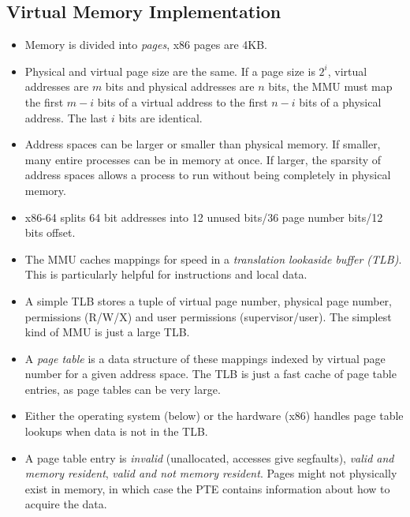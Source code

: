 \documentclass[12pt]{article}
\begin{document}
\subsection{Virtual Memory Implementation}
\begin{itemize}
	\item Memory is divided into \textit{pages}, x86 pages are 4KB. 
	\item Physical and virtual page size are the same. If a page size is $2^{i}$, virtual addresses are $m$ bits and physical addresses are $n$ bits, the MMU must map the first $m-i$ bits of a virtual address to the first $n-i$ bits of a physical address. The last $i$ bits are identical. 
	\item Address spaces can be larger or smaller than physical memory. If smaller, many entire processes can be in memory at once. If larger, the sparsity of address spaces allows a process to run without being completely in physical memory.
	\item x86-64 splits 64 bit addresses into 12 unused bits/36 page number bits/12 bits offset. 
	\item The MMU caches mappings for speed in a \textit{translation lookaside buffer (TLB)}. This is particularly helpful for instructions and local data. 
	\item A simple TLB stores a tuple of virtual page number, physical page number, permissions (R/W/X) and user permissions (supervisor/user). The simplest kind of MMU is just a large TLB. 
	\item A \textit{page table} is a data structure of these mappings indexed by virtual page number for a given address space. The TLB is just a fast cache of page table entries, as page tables can be very large.  
	\item Either the operating system (below) or the hardware (x86) handles page table lookups when data is not in the TLB. 
	\item A page table entry is \textit{invalid} (unallocated, accesses give segfaults), \textit{valid and memory resident}, \textit{valid and not memory resident}. Pages might not physically exist in memory, in which case the PTE contains information about how to acquire the data. 
\end{itemize}

\newpage 
\end{document}
